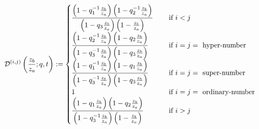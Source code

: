 \documentclass[12pt,reqno,a4paper]{amsart}
\newcommand{\cals}[1]{\mathcal{#1}}
\numberwithin{equation}{section}
\theoremstyle{definition}
\begin{document}
\begin{align}
	\cals{D}^{(i,j)}\left(
	\frac{z_b}{z_a}
	; q, t
	\right)
	:= 
	\begin{cases}
		\displaystyle 
		\frac{
			\left(1 - q_1^{-1}\frac{z_b}{z_a}\right)
			\left(1 - q_2^{-1}\frac{z_b}{z_a}\right)
		}{
			\left(1 - q_3\frac{z_b}{z_a}\right)
			\left(1 - \frac{z_b}{z_a}\right)
		}
		\hspace{0.3cm}
		&\text{ if } i < j
		\\
		\displaystyle 
		\frac{
			\left(1 - q_2^{-1}\frac{z_b}{z_a}\right)
			\left(1 - q_2\frac{z_b}{z_a}\right)
		}{
			\left(1 - q_3^{-1}\frac{z_b}{z_a}\right)
			\left(1 - q_3\frac{z_b}{z_a}\right)
		}
		\hspace{0.3cm}
		&\text{ if } i = j = \text{ hyper-number }
		\\
		\displaystyle 
		\frac{
			\left(1 - q_1^{-1}\frac{z_b}{z_a}\right)
			\left(1 - q_1\frac{z_b}{z_a}\right)
		}{
			\left(1 - q_3^{-1}\frac{z_b}{z_a}\right)
			\left(1 - q_3\frac{z_b}{z_a}\right)
		}
		\hspace{0.3cm}
		&\text{ if } i = j = \text{ super-number }
		\\
		1
		\hspace{0.3cm}
		&\text{ if } i = j = \text{ ordinary-number }
		\\
		\displaystyle
		\frac{
			\left(1 - q_1\frac{z_b}{z_a}\right)
			\left(1 - q_2\frac{z_b}{z_a}\right)
		}{
			\left(1 - q_3^{-1}\frac{z_b}{z_a}\right)
			\left(1 - \frac{z_b}{z_a}\right)
		}
		\hspace{0.3cm}
		&\text{ if } i > j 
	\end{cases}
\end{align}
\normalsize
\end{document}
